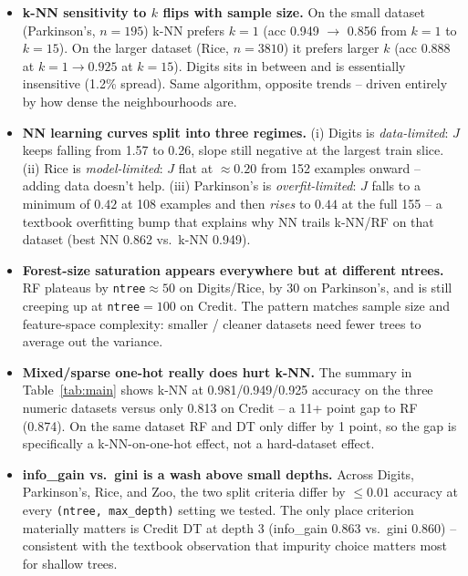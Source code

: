 \documentclass[11pt]{article}
\begin{document}
\begin{itemize}
  \item \textbf{k-NN sensitivity to $k$ flips with sample size.} On the small dataset (Parkinson's, $n{=}195$) k-NN prefers $k{=}1$ (acc 0.949 $\to$ 0.856 from $k{=}1$ to $k{=}15$). On the larger dataset (Rice, $n{=}3810$) it prefers larger $k$ (acc 0.888 at $k{=}1 \to 0.925$ at $k{=}15$). Digits sits in between and is essentially insensitive (1.2\% spread). Same algorithm, opposite trends -- driven entirely by how dense the neighbourhoods are.

  \item \textbf{NN learning curves split into three regimes.} (i) Digits is \emph{data-limited}: $J$ keeps falling from 1.57 to 0.26, slope still negative at the largest train slice. (ii) Rice is \emph{model-limited}: $J$ flat at $\approx 0.20$ from 152 examples onward -- adding data doesn't help. (iii) Parkinson's is \emph{overfit-limited}: $J$ falls to a minimum of $0.42$ at 108 examples and then \emph{rises} to $0.44$ at the full 155 -- a textbook overfitting bump that explains why NN trails k-NN/RF on that dataset (best NN 0.862 vs.\ k-NN 0.949).

  \item \textbf{Forest-size saturation appears everywhere but at different ntrees.} RF plateaus by \texttt{ntree}$\approx 50$ on Digits/Rice, by 30 on Parkinson's, and is still creeping up at \texttt{ntree}$=100$ on Credit. The pattern matches sample size and feature-space complexity: smaller / cleaner datasets need fewer trees to average out the variance.

  \item \textbf{Mixed/sparse one-hot really does hurt k-NN.} The summary in Table~\ref{tab:main} shows k-NN at 0.981/0.949/0.925 accuracy on the three numeric datasets versus only 0.813 on Credit -- a 11+ point gap to RF (0.874). On the same dataset RF and DT only differ by 1 point, so the gap is specifically a k-NN-on-one-hot effect, not a hard-dataset effect.

  \item \textbf{info\_gain vs.\ gini is a wash above small depths.} Across Digits, Parkinson's, Rice, and Zoo, the two split criteria differ by $\leq 0.01$ accuracy at every \texttt{(ntree, max\_depth)} setting we tested. The only place criterion materially matters is Credit DT at depth 3 (info\_gain 0.863 vs.\ gini 0.860) -- consistent with the textbook observation that impurity choice matters most for shallow trees.
\end{itemize}
\end{document}
